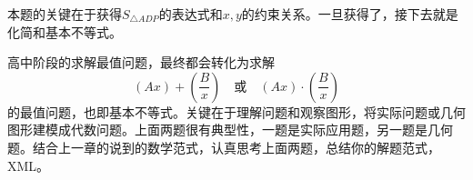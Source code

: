 \begin{tcolorbox}
本题的关键在于获得$S_{\bigtriangleup ADP}$的表达式和$x,y$的约束关系。一旦获得了，接下去就是化简和基本不等式。
\end{tcolorbox}

\begin{tcolorbox}
高中阶段的求解最值问题，最终都会转化为求解
\[
\left( Ax \right) +\left( \frac{B}{x} \right) \quad \text{或} \quad \left( Ax \right) \cdot \left( \frac{B}{x} \right)
\]
的最值问题，也即基本不等式。关键在于理解问题和观察图形，将实际问题或几何图形建模成代数问题。上面两题很有典型性，一题是实际应用题，另一题是几何题。结合上一章的说到的数学范式，认真思考上面两题，总结你的解题范式，XML。
\end{tcolorbox}




